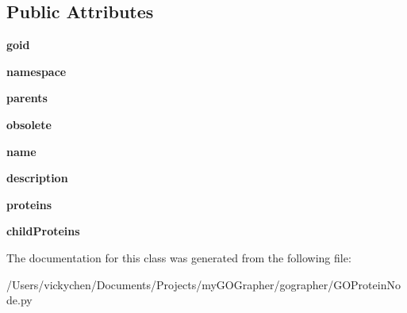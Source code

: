 \subsection*{Public Attributes}
\begin{DoxyCompactItemize}
\item 
\hypertarget{class_g_o_protein_node_1_1_g_o_protein_node_af96cbc9d0700be1a7153792d65347f39}{
{\bfseries goid}}
\label{class_g_o_protein_node_1_1_g_o_protein_node_af96cbc9d0700be1a7153792d65347f39}

\item 
\hypertarget{class_g_o_protein_node_1_1_g_o_protein_node_a8f538824bb0095108f442b5c7467c34a}{
{\bfseries namespace}}
\label{class_g_o_protein_node_1_1_g_o_protein_node_a8f538824bb0095108f442b5c7467c34a}

\item 
\hypertarget{class_g_o_protein_node_1_1_g_o_protein_node_acad325220c897d39ce0bdba143532f82}{
{\bfseries parents}}
\label{class_g_o_protein_node_1_1_g_o_protein_node_acad325220c897d39ce0bdba143532f82}

\item 
\hypertarget{class_g_o_protein_node_1_1_g_o_protein_node_a43161f37af36eedec1d10bef24d484df}{
{\bfseries obsolete}}
\label{class_g_o_protein_node_1_1_g_o_protein_node_a43161f37af36eedec1d10bef24d484df}

\item 
\hypertarget{class_g_o_protein_node_1_1_g_o_protein_node_a354a329cd145c58531582101897ee08b}{
{\bfseries name}}
\label{class_g_o_protein_node_1_1_g_o_protein_node_a354a329cd145c58531582101897ee08b}

\item 
\hypertarget{class_g_o_protein_node_1_1_g_o_protein_node_a248311f8178f70cadfcb50d94eab318f}{
{\bfseries description}}
\label{class_g_o_protein_node_1_1_g_o_protein_node_a248311f8178f70cadfcb50d94eab318f}

\item 
\hypertarget{class_g_o_protein_node_1_1_g_o_protein_node_ac6d420db24141333572c086df7c3ef91}{
{\bfseries proteins}}
\label{class_g_o_protein_node_1_1_g_o_protein_node_ac6d420db24141333572c086df7c3ef91}

\item 
\hypertarget{class_g_o_protein_node_1_1_g_o_protein_node_a6d2fe3a47ff6e8f08bb5f465bd711f63}{
{\bfseries childProteins}}
\label{class_g_o_protein_node_1_1_g_o_protein_node_a6d2fe3a47ff6e8f08bb5f465bd711f63}

\end{DoxyCompactItemize}


The documentation for this class was generated from the following file:\begin{DoxyCompactItemize}
\item 
/Users/vickychen/Documents/Projects/myGOGrapher/gographer/GOProteinNode.py\end{DoxyCompactItemize}
